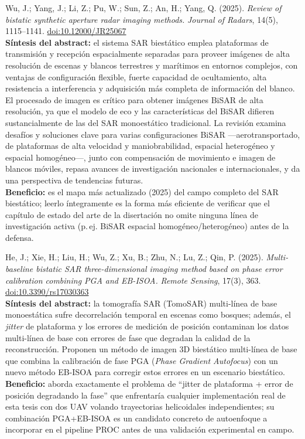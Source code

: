 \documentclass[11pt,a4paper]{article}
\begin{document}
\begin{enumerate}[label=\textbf{[C\arabic*]}, leftmargin=2.2cm, itemsep=10pt]
\item Wu, J.; Yang, J.; Li, Z.; Pu, W.; Sun, Z.; An, H.; Yang, Q. (2025).
\textit{Review of bistatic synthetic aperture radar imaging methods.}
\emph{Journal of Radars}, 14(5), 1115--1141.
\href{https://doi.org/10.12000/JR25067}{doi:10.12000/JR25067}
\cite{wu2025}\\
\textbf{Síntesis del abstract:} el sistema SAR biestático emplea
plataformas de transmisión y recepción espacialmente separadas para
proveer imágenes de alta resolución de escenas y blancos terrestres y
marítimos en entornos complejos, con ventajas de configuración flexible,
fuerte capacidad de ocultamiento, alta resistencia a interferencia y
adquisición más completa de información del blanco. El procesado de imagen
es crítico para obtener imágenes BiSAR de alta resolución, ya que el
modelo de eco y las características del BiSAR difieren sustancialmente de
las del SAR monoestático tradicional. La revisión examina desafíos y
soluciones clave para varias configuraciones BiSAR —aerotransportado, de
plataformas de alta velocidad y maniobrabilidad, espacial heterogéneo y
espacial homogéneo—, junto con compensación de movimiento e imagen de
blancos móviles, repasa avances de investigación nacionales e
internacionales, y da una perspectiva de tendencias futuras.\\
\textbf{Beneficio:} es el mapa más actualizado (2025) del campo completo
del SAR biestático; leerlo íntegramente es la forma más eficiente de
verificar que el capítulo de estado del arte de la disertación no omite
ninguna línea de investigación activa (p.\,ej. BiSAR espacial
homogéneo/heterogéneo) antes de la defensa.

\item He, J.; Xie, H.; Liu, H.; Wu, Z.; Xu, B.; Zhu, N.; Lu, Z.; Qin, P.
(2025). \textit{Multi-baseline bistatic SAR three-dimensional imaging
method based on phase error calibration combining PGA and EB-ISOA.}
\emph{Remote Sensing}, 17(3), 363.
\href{https://doi.org/10.3390/rs17030363}{doi:10.3390/rs17030363}
\cite{he2025}\\
\textbf{Síntesis del abstract:} la tomografía SAR (TomoSAR) multi-línea de
base monoestática sufre decorrelación temporal en escenas como bosques;
además, el \emph{jitter} de plataforma y los errores de medición de
posición contaminan los datos multi-línea de base con errores de fase que
degradan la calidad de la reconstrucción. Proponen un método de imagen 3D
biestático multi-línea de base que combina la calibración de fase PGA
(\emph{Phase Gradient Autofocus}) con un nuevo método EB-ISOA para corregir
estos errores en un escenario biestático.\\
\textbf{Beneficio:} aborda exactamente el problema de ``jitter de
plataforma + error de posición degradando la fase'' que enfrentaría
cualquier implementación real de esta tesis con dos UAV volando
trayectorias helicoidales independientes; su combinación PGA+EB-ISOA es un
candidato concreto de autoenfoque a incorporar en el pipeline PROC antes
de una validación experimental en campo.


\end{enumerate}
\end{document}
